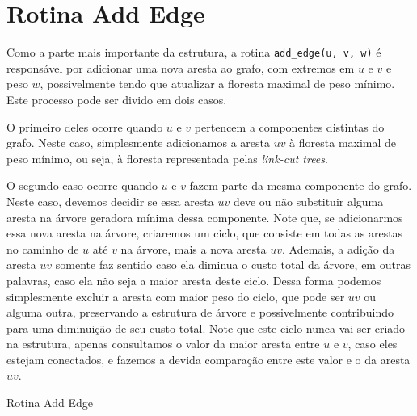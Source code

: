 \section{Rotina Add Edge}
\label{sec:imsf-add-edge}

Como a parte mais importante da estrutura, a rotina \texttt{add\_edge(u, v, w)} é responsável por adicionar uma nova aresta ao grafo, com extremos em $u$ e $v$ e peso $w$, possivelmente tendo que atualizar a floresta maximal de peso mínimo. Este processo pode ser divido em dois casos.

O primeiro deles ocorre quando $u$ e $v$ pertencem a componentes distintas do grafo. Neste caso, simplesmente adicionamos a aresta $uv$ à floresta maximal de peso mínimo, ou seja, à floresta representada pelas \emph{link-cut trees}.

O segundo caso ocorre quando $u$ e $v$ fazem parte da mesma componente do grafo. Neste caso, devemos decidir se essa aresta $uv$ deve ou não substituir alguma aresta na árvore geradora mínima dessa componente. Note que, se adicionarmos essa nova aresta na árvore, criaremos um ciclo, que consiste em todas as arestas no caminho de $u$ até $v$ na árvore, mais a nova aresta $uv$. Ademais, a adição da aresta $uv$ somente faz sentido caso ela diminua o custo total da árvore, em outras palavras, caso ela não seja a maior aresta deste ciclo. Dessa forma podemos simplesmente excluir a aresta com maior peso do ciclo, que pode ser $uv$ ou alguma outra, preservando a estrutura de árvore e possivelmente contribuindo para uma diminuição de seu custo total. Note que este ciclo nunca vai ser criado na estrutura, apenas consultamos o valor da maior aresta entre $u$ e $v$, caso eles estejam conectados, e fazemos a devida comparação entre este valor e o da aresta $uv$.

\begin{algorithm}[h!]
    \caption{Rotina Add Edge}\label{imsf-add-edge}
    \begin{algorithmic}[1]
        \EndIf
        \EndFunction
    \end{algorithmic}
\end{algorithm}

